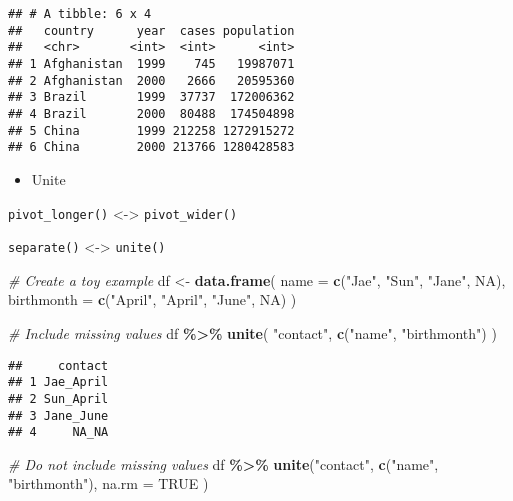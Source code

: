 \documentclass[
]{book}
\newenvironment{Shaded}{\begin{snugshade}}{\end{snugshade}}
\newcommand{\CommentTok}[1]{\textcolor[rgb]{0.56,0.35,0.01}{\textit{#1}}}
\newcommand{\DataTypeTok}[1]{\textcolor[rgb]{0.13,0.29,0.53}{#1}}
\newcommand{\KeywordTok}[1]{\textcolor[rgb]{0.13,0.29,0.53}{\textbf{#1}}}
\newcommand{\NormalTok}[1]{#1}
\newcommand{\OperatorTok}[1]{\textcolor[rgb]{0.81,0.36,0.00}{\textbf{#1}}}
\newcommand{\OtherTok}[1]{\textcolor[rgb]{0.56,0.35,0.01}{#1}}
\newcommand{\StringTok}[1]{\textcolor[rgb]{0.31,0.60,0.02}{#1}}
\providecommand{\tightlist}{%
  \setlength{\itemsep}{0pt}\setlength{\parskip}{0pt}}
\begin{document}
\begin{verbatim}
## # A tibble: 6 x 4
##   country      year  cases population
##   <chr>       <int>  <int>      <int>
## 1 Afghanistan  1999    745   19987071
## 2 Afghanistan  2000   2666   20595360
## 3 Brazil       1999  37737  172006362
## 4 Brazil       2000  80488  174504898
## 5 China        1999 212258 1272915272
## 6 China        2000 213766 1280428583
\end{verbatim}

\begin{itemize}
\tightlist
\item
  Unite
\end{itemize}

\texttt{pivot\_longer()} \textless-\textgreater{} \texttt{pivot\_wider()}

\texttt{separate()} \textless-\textgreater{} \texttt{unite()}

\begin{Shaded}
\begin{Highlighting}[]
\CommentTok{\# Create a toy example}
\NormalTok{df \textless{}{-}}\StringTok{ }\KeywordTok{data.frame}\NormalTok{(}
  \DataTypeTok{name =} \KeywordTok{c}\NormalTok{(}\StringTok{"Jae"}\NormalTok{, }\StringTok{"Sun"}\NormalTok{, }\StringTok{"Jane"}\NormalTok{, }\OtherTok{NA}\NormalTok{),}
  \DataTypeTok{birthmonth =} \KeywordTok{c}\NormalTok{(}\StringTok{"April"}\NormalTok{, }\StringTok{"April"}\NormalTok{, }\StringTok{"June"}\NormalTok{, }\OtherTok{NA}\NormalTok{)}
\NormalTok{)}

\CommentTok{\# Include missing values}
\NormalTok{df }\OperatorTok{\%\textgreater{}\%}\StringTok{ }\KeywordTok{unite}\NormalTok{(}
  \StringTok{"contact"}\NormalTok{,}
  \KeywordTok{c}\NormalTok{(}\StringTok{"name"}\NormalTok{, }\StringTok{"birthmonth"}\NormalTok{)}
\NormalTok{)}
\end{Highlighting}
\end{Shaded}

\begin{verbatim}
##     contact
## 1 Jae_April
## 2 Sun_April
## 3 Jane_June
## 4     NA_NA
\end{verbatim}

\begin{Shaded}
\begin{Highlighting}[]
\CommentTok{\# Do not include missing values}
\NormalTok{df }\OperatorTok{\%\textgreater{}\%}\StringTok{ }\KeywordTok{unite}\NormalTok{(}\StringTok{"contact"}\NormalTok{,}
  \KeywordTok{c}\NormalTok{(}\StringTok{"name"}\NormalTok{, }\StringTok{"birthmonth"}\NormalTok{),}
  \DataTypeTok{na.rm =} \OtherTok{TRUE}
\NormalTok{)}
\end{Highlighting}
\end{Shaded}
\end{document}
